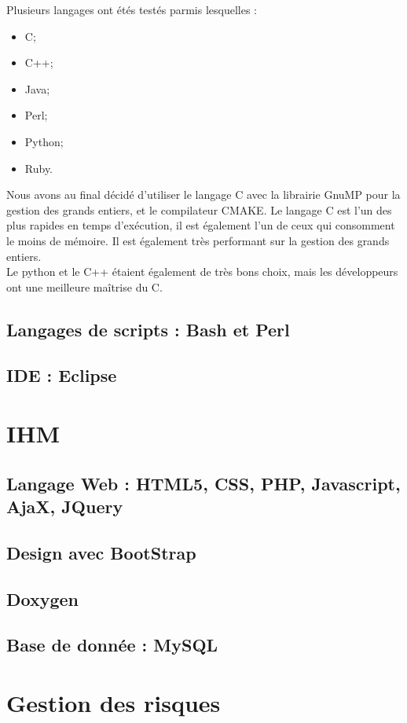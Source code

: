Plusieurs langages ont étés testés parmis lesquelles :
\begin{itemize}
\item C;
\item C++;
\item Java;
\item Perl;
\item Python;
\item Ruby.\\
\end{itemize}

Nous avons au final décidé d'utiliser le langage C avec la librairie GnuMP \cite{gmplib} pour la gestion des grands entiers, et le compilateur CMAKE.
Le langage C est l'un des plus rapides en temps d'exécution, il est également l'un de ceux qui consomment le moins de mémoire. Il est également très performant sur la gestion des grands entiers.\\
Le python et le C++ étaient également de très bons choix, mais les développeurs ont une meilleure maîtrise du C.

\subsection{Langages de scripts : Bash et Perl}

\subsection{IDE : Eclipse}

\section{IHM}

\subsection{Langage Web : HTML5, CSS, PHP, Javascript, AjaX, JQuery}

\subsection{Design avec BootStrap}

\subsection{Doxygen}

\subsection{Base de donnée : MySQL}

\section{Gestion des risques}
